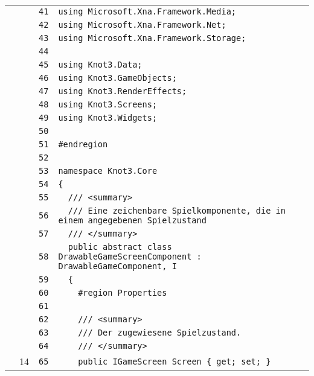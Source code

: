 \documentclass[a4paper,10pt]{article}
\begin{document}
\begin{longtable}[l]{lrrl}
\cellcolor{gray} &  & \verb~41~ & \verb~using Microsoft.Xna.Framework.Media;~\\
\cellcolor{gray} &  & \verb~42~ & \verb~using Microsoft.Xna.Framework.Net;~\\
\cellcolor{gray} &  & \verb~43~ & \verb~using Microsoft.Xna.Framework.Storage;~\\
\cellcolor{gray} &  & \verb~44~ & \verb~~\\
\cellcolor{gray} &  & \verb~45~ & \verb~using Knot3.Data;~\\
\cellcolor{gray} &  & \verb~46~ & \verb~using Knot3.GameObjects;~\\
\cellcolor{gray} &  & \verb~47~ & \verb~using Knot3.RenderEffects;~\\
\cellcolor{gray} &  & \verb~48~ & \verb~using Knot3.Screens;~\\
\cellcolor{gray} &  & \verb~49~ & \verb~using Knot3.Widgets;~\\
\cellcolor{gray} &  & \verb~50~ & \verb~~\\
\cellcolor{gray} &  & \verb~51~ & \verb~#endregion~\\
\cellcolor{gray} &  & \verb~52~ & \verb~~\\
\cellcolor{gray} &  & \verb~53~ & \verb~namespace Knot3.Core~\\
\cellcolor{gray} &  & \verb~54~ & \verb~{~\\
\cellcolor{gray} &  & \verb~55~ & \verb~  /// <summary>~\\
\cellcolor{gray} &  & \verb~56~ & \verb~  /// Eine zeichenbare Spielkomponente, die in einem angegebenen Spielzustand ~\\
\cellcolor{gray} &  & \verb~57~ & \verb~  /// </summary>~\\
\cellcolor{gray} &  & \verb~58~ & \verb~  public abstract class DrawableGameScreenComponent : DrawableGameComponent, I~\\
\cellcolor{gray} &  & \verb~59~ & \verb~  {~\\
\cellcolor{gray} &  & \verb~60~ & \verb~    #region Properties~\\
\cellcolor{gray} &  & \verb~61~ & \verb~~\\
\cellcolor{gray} &  & \verb~62~ & \verb~    /// <summary>~\\
\cellcolor{gray} &  & \verb~63~ & \verb~    /// Der zugewiesene Spielzustand.~\\
\cellcolor{gray} &  & \verb~64~ & \verb~    /// </summary>~\\
\cellcolor{green} & 14 & \verb~65~ & \verb~    public IGameScreen Screen { get; set; }~\\

\end{longtable}
\end{document}

